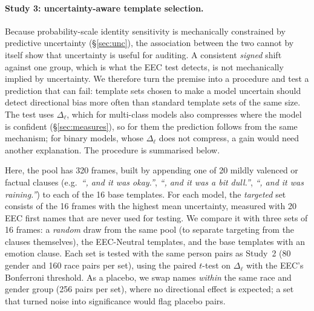 \documentclass[runningheads]{llncs}
\begin{document}
\paragraph{Study 3: uncertainty-aware template selection.} Because
probability-scale identity sensitivity is mechanically constrained by
predictive uncertainty (\S\ref{sec:unc}), the association between the two cannot by itself show that
uncertainty is useful for auditing. A consistent \emph{signed} shift against one
group, which is what the EEC test detects, is not mechanically implied by
uncertainty. We therefore turn the premise into a procedure and test a
prediction that can fail: template sets chosen to make a model uncertain should
detect directional bias more often than standard template sets of the same
size. The test uses $\Delta_\ell$, which for multi-class models also compresses
where the model is confident (\S\ref{sec:measures}), so for them the prediction
follows from the same mechanism; for binary models, whose $\Delta_\ell$ does
not compress, a gain would need another explanation. The procedure is
summarised below.

\begin{center}\end{center}

Here, the pool has 320 frames, built by appending one of 20 mildly valenced or
factual clauses (e.g.\ \emph{``, and it was okay.''}, \emph{``, and it was a bit
dull.''}, \emph{``, and it was raining.''}) to each of the 16 base templates.
For each model, the \emph{targeted} set consists of the 16 frames with the
highest mean uncertainty, measured with 20 EEC first names that are never used
for testing. We compare it with three sets of 16 frames: a
\emph{random} draw from the same pool (to separate targeting from the clauses
themselves), the EEC-Neutral templates, and the base templates with an emotion
clause. Each set is tested with the same person pairs as Study~2 (80 gender and
160 race pairs per set), using the paired $t$-test on $\Delta_\ell$ with the
EEC's Bonferroni threshold. As a placebo, we swap names \emph{within} the same
race and gender group (256 pairs per set), where no directional effect is
expected; a set that turned noise into significance would flag placebo pairs.
\end{document}
